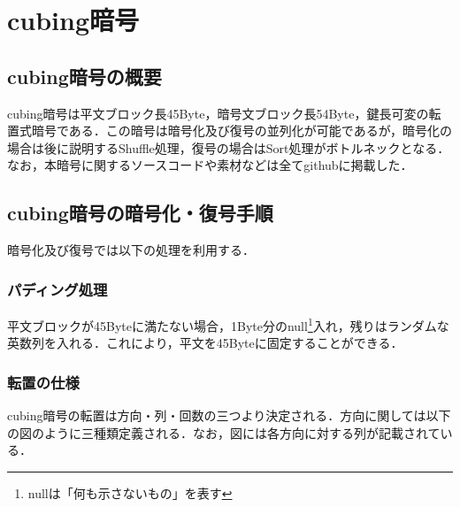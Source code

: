 \documentclass[a4p]{jarticle}
\begin{document}
\section{cubing暗号}
\subsection{cubing暗号の概要}
cubing暗号は平文ブロック長45Byte，暗号文ブロック長54Byte，鍵長可変の転置式暗号である．この暗号は暗号化及び復号の並列化が可能であるが，暗号化の場合は後に説明するShuffle処理，復号の場合はSort処理がボトルネックとなる．なお，本暗号に関するソースコードや素材などは全てgithubに掲載した．\cite{github}

\subsection{cubing暗号の暗号化・復号手順}
暗号化及び復号では以下の処理を利用する．

\subsubsection{パディング処理}
平文ブロックが45Byteに満たない場合，1Byte分のnull\footnote{nullは「何も示さないもの」を表す}入れ，残りはランダムな英数列を入れる．これにより，平文を45Byteに固定することができる．

\subsubsection{転置の仕様}
cubing暗号の転置は方向・列・回数の三つより決定される．方向に関しては以下の図のように三種類定義される．なお，図には各方向に対する列が記載されている．
\end{document}
